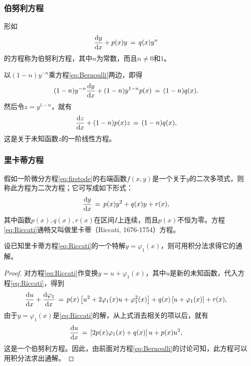 \subsubsection{伯努利方程}
\begin{defn}\label{def:eq:Bernoulli}
形如
\begin{equation}\label{eq:Bernoulli}
\frac{\mathrm{d}{}y}{\mathrm{d}{}x}+p(x)y\,=\,q(x)y^n
\end{equation}
的方程称为伯努利方程，其中$n$为常数，而且$n\neq 0$和$1$。
\end{defn}\par
以$(1-n)y^{-n}$乘方程\eqref{eq:Bernoulli}两边，即得
$$(1-n)y^{-n}\frac{\mathrm{d}{}y}{\mathrm{d}{}x}+(1-n)y^{1-n}p(x)\,=\,(1-n)q(x).$$
然后令$z=y^{1-n}$，就有
$$\frac{\mathrm{d}{}z}{\mathrm{d}{}x}+(1-n)p(x)z\,=\,(1-n)q(x),$$
这是关于未知函数$z$的一阶线性方程。

\subsubsection{里卡蒂方程}
\begin{defn}\label{def:eq:Riccati}
假如一阶微分方程\eqref{eq:firstode}的右端函数$f(x,y)$是一个关于$y$的二次多项式，则称此方程为二次方程；它可写成如下形式：
\begin{equation}\label{eq:Riccati}
\frac{\mathrm{d}{}y}{\mathrm{d}{}x}\,=\,p(x)y^2+q(x)y+r(x),
\end{equation}
其中函数$p(x),q(x),r(x)$在区间$I$上连续，而且$p(x)$不恒为零。方程\eqref{eq:Riccati}通畅又叫做里卡蒂（Riccati, 1676-1754）方程。
\end{defn}

\begin{theo}\label{theo:Riccati:sol}
设已知里卡蒂方程\eqref{eq:Riccati}的一个特解$y=\varphi_1(x)$，则可用积分法求得它的通解。
\end{theo}
\begin{proof}
对方程\eqref{eq:Riccati}作变换$y=u+\varphi_1(x)$，其中$u$是新的未知函数，代入方程\eqref{eq:Riccati}，得到
$$\frac{\mathrm{d}{}u}{\mathrm{d}{}x}+\frac{\mathrm{d}{}\varphi_1}{\mathrm{d}{}x}\,=\,p(x)\left[u^2+2\varphi_1(x)u+\varphi_1^2(x)\right]+q(x)\left[u+\varphi_1(x)\right]+r(x),$$
由于$y=\varphi_1(x)$是\eqref{eq:Riccati}的解，从上式消去相关的项以后，就有
$$\frac{\mathrm{d}{}u}{\mathrm{d}{}x}\,=\,\left[2p(x)\varphi_1(x)+q(x)\right]u+p(x)u^2,$$
这是一个伯努利方程。因此，由前面对方程\eqref{eq:Bernoulli}的讨论可知，此方程可以用积分法求出通解。
\end{proof}

